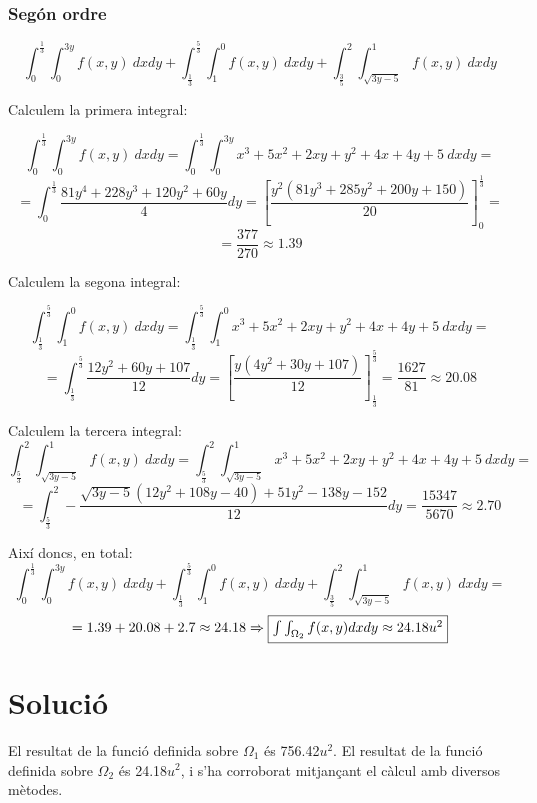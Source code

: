 \documentclass[12pt]{report}
\begin{document}
\subsubsection{Segón ordre}
\[\int_{0}^{\frac{1}{3}}\int_{0}^{3y} f(x,y)\ dxdy + \int_{\frac{1}{3}}^{\frac{5}{3}}\int_{1}^{0} f(x,y)\ dxdy+ \int_{\frac{3}{5}}^{2}\int_{\sqrt{3y-5}}^{1} f(x,y)\ dxdy \]

Calculem la primera integral:

\[\int_{0}^{\frac{1}{3}}\int_{0}^{3y} f(x,y)\ dxdy = 
\int_{0}^{\frac{1}{3}}\int_{0}^{3y} x^{3}+5x^{2}+2xy+y^{2}+4x+4y+5\ dxdy = \]
\[=\int_{0}^{\frac{1}{3}} \frac{81y^4+228y^3+120y^2+60y}{4} dy = \left[ \frac{y^2(81y^3 + 285y^2 + 200y + 150)}{20} \right]_{0}^\frac{1}{3} = \]
\[= \frac{377}{270} \approx 1.39 \]

Calculem la segona integral:

\[ \int_{\frac{1}{3}}^{\frac{5}{3}}\int_{1}^{0} f(x,y)\ dxdy = \int_{\frac{1}{3}}^{\frac{5}{3}}\int_{1}^{0} x^{3}+5x^{2}+2xy+y^{2}+4x+4y+5\ dxdy =\]
\[= \int_{\frac{1}{3}}^{\frac{5}{3}}\frac{12y^2+60y+107}{12}dy = \left[ \frac{y(4y^2+30y+107)}{12}\right]^{{\frac{5}{3}}}_{\frac{1}{3}}= \frac{1627}{81} \approx 20.08\]

Calculem la tercera integral:
\[\int_{\frac{5}{3}}^{2}\int_{\sqrt{3y-5}}^{1} f(x,y)\ dxdy = \int_{\frac{5}{3}}^{2}\int_{\sqrt{3y-5}}^{1} x^{3}+5x^{2}+2xy+y^{2}+4x+4y+5\ dxdy = \]
\[=\int_{\frac{5}{3}}^{2} -\frac{\sqrt{3y-5}(12y^2+108y-40) + 51y^2 - 138y -152}{12}dy = \frac{15347}{5670} \approx 2.70 \]

Així doncs, en total:
\[\int_{0}^{\frac{1}{3}}\int_{0}^{3y} f(x,y)\ dxdy + \int_{\frac{1}{3}}^{\frac{5}{3}}\int_{1}^{0} f(x,y)\ dxdy+ \int_{\frac{3}{5}}^{2}\int_{\sqrt{3y-5}}^{1} f(x,y)\ dxdy =  \]
\begin{equation*}
    = 1.39 + 20.08 + 2.7 \approx 24.18 \Rightarrow \fcolorbox{black}{white}{$\int\int_{\Omega_2} f(x,y)dxdy \approx 24.18 u^2$}
\end{equation*}

    

\section{Solució}
El resultat de la funció definida sobre $\Omega_1$ és 756.42$u^2$.
\newline
El resultat de la funció definida sobre $\Omega_2$ és 24.18$u^2$, i s'ha corroborat mitjançant el càlcul amb diversos mètodes.
\end{document}
